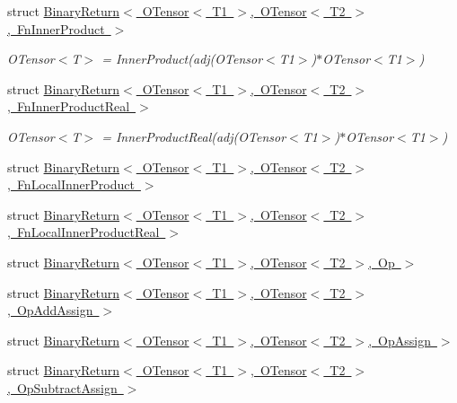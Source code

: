 \begin{DoxyCompactItemize}
\item 
struct \mbox{\hyperlink{structENSEM_1_1BinaryReturn_3_01OTensor_3_01T1_01_4_00_01OTensor_3_01T2_01_4_00_01FnInnerProduct_01_4}{Binary\+Return$<$ O\+Tensor$<$ T1 $>$, O\+Tensor$<$ T2 $>$, Fn\+Inner\+Product $>$}}
\begin{DoxyCompactList}\small\item\em O\+Tensor$<$\+T$>$ = Inner\+Product(adj(\+O\+Tensor$<$\+T1$>$)$\ast$\+O\+Tensor$<$\+T1$>$) \end{DoxyCompactList}\item 
struct \mbox{\hyperlink{structENSEM_1_1BinaryReturn_3_01OTensor_3_01T1_01_4_00_01OTensor_3_01T2_01_4_00_01FnInnerProductReal_01_4}{Binary\+Return$<$ O\+Tensor$<$ T1 $>$, O\+Tensor$<$ T2 $>$, Fn\+Inner\+Product\+Real $>$}}
\begin{DoxyCompactList}\small\item\em O\+Tensor$<$\+T$>$ = Inner\+Product\+Real(adj(\+O\+Tensor$<$\+T1$>$)$\ast$\+O\+Tensor$<$\+T1$>$) \end{DoxyCompactList}\item 
struct \mbox{\hyperlink{structENSEM_1_1BinaryReturn_3_01OTensor_3_01T1_01_4_00_01OTensor_3_01T2_01_4_00_01FnLocalInnerProduct_01_4}{Binary\+Return$<$ O\+Tensor$<$ T1 $>$, O\+Tensor$<$ T2 $>$, Fn\+Local\+Inner\+Product $>$}}
\item 
struct \mbox{\hyperlink{structENSEM_1_1BinaryReturn_3_01OTensor_3_01T1_01_4_00_01OTensor_3_01T2_01_4_00_01FnLocalInnerProductReal_01_4}{Binary\+Return$<$ O\+Tensor$<$ T1 $>$, O\+Tensor$<$ T2 $>$, Fn\+Local\+Inner\+Product\+Real $>$}}
\item 
struct \mbox{\hyperlink{structENSEM_1_1BinaryReturn_3_01OTensor_3_01T1_01_4_00_01OTensor_3_01T2_01_4_00_01Op_01_4}{Binary\+Return$<$ O\+Tensor$<$ T1 $>$, O\+Tensor$<$ T2 $>$, Op $>$}}
\item 
struct \mbox{\hyperlink{structENSEM_1_1BinaryReturn_3_01OTensor_3_01T1_01_4_00_01OTensor_3_01T2_01_4_00_01OpAddAssign_01_4}{Binary\+Return$<$ O\+Tensor$<$ T1 $>$, O\+Tensor$<$ T2 $>$, Op\+Add\+Assign $>$}}
\item 
struct \mbox{\hyperlink{structENSEM_1_1BinaryReturn_3_01OTensor_3_01T1_01_4_00_01OTensor_3_01T2_01_4_00_01OpAssign_01_4}{Binary\+Return$<$ O\+Tensor$<$ T1 $>$, O\+Tensor$<$ T2 $>$, Op\+Assign $>$}}
\item 
struct \mbox{\hyperlink{structENSEM_1_1BinaryReturn_3_01OTensor_3_01T1_01_4_00_01OTensor_3_01T2_01_4_00_01OpSubtractAssign_01_4}{Binary\+Return$<$ O\+Tensor$<$ T1 $>$, O\+Tensor$<$ T2 $>$, Op\+Subtract\+Assign $>$}}

\end{DoxyCompactItemize}
